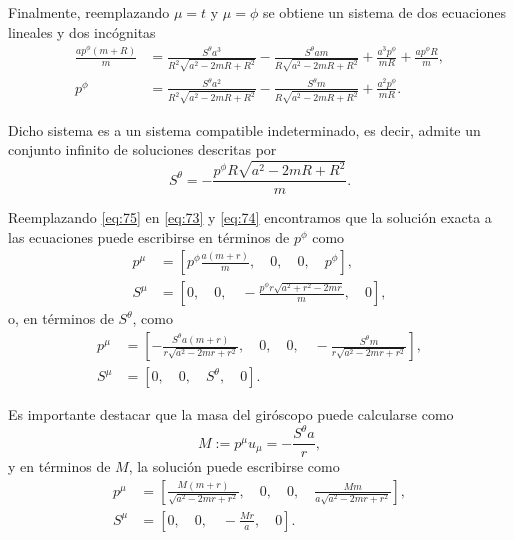 Finalmente, reemplazando $\mu=t$ y $\mu=\phi$ se obtiene un sistema de dos ecuaciones lineales y dos incógnitas
\begin{align}
\frac{a p^{\phi}(m+R)}{m} &= \frac{S^{\theta} a^{3}}{R^{2} \sqrt{a^{2} - 2 m R + R^{2}}} - \frac{S^{\theta} a m}{R\sqrt{a^{2} - 2 m R + R^{2}}} + \frac{a^{3} p^{\phi}}{m R} + \frac{a p^{\phi} R}{m},\\
p^{\phi} &= \frac{S^{\theta} a^{2}}{R^{2}\sqrt{a^{2} - 2 m R + R^{2}}} - \frac{S^{\theta} m}{R\sqrt{a^{2} - 2 m R + R^{2}}} + \frac{a^{2} p^{\phi}}{m R}.
\end{align}

Dicho sistema es a un sistema compatible indeterminado, es decir, admite un conjunto infinito de soluciones descritas por
\begin{equation}
\label{eq:75}
S^{\theta} = - \frac{p^{\phi}R \sqrt{a^2 - 2mR +R^2}}{m}.
\end{equation}

Reemplazando \eqref{eq:75} en \eqref{eq:73} y \eqref{eq:74} encontramos que la solución exacta a las ecuaciones puede escribirse en términos de $p^{\phi}$ como
\begin{align}
p^{\mu} &= \left[ p^{\phi} \frac{a(m+r)}{m},\quad 0,\quad 0,\quad p^{\phi} \right],\\
S^{\mu} &= \left[0,\quad 0,\quad -\frac{p^{\phi} r\sqrt{a^2+r^2-2mr}}{m},\quad 0\right],
\end{align}
o, en términos de $S^{\theta}$, como
\begin{align}
\label{eq:76}
p^{\mu} &= \left [ - \frac{S^{\theta} a \left(m + r\right)}{r \sqrt{a^{2} - 2 m r + r^{2}} }, \quad 0, \quad 0, \quad - \frac{S^{\theta} m}{r\sqrt{a^{2} - 2 m r + r^{2}}}\right ],\\
\label{eq:77}
S^{\mu} &= \left [ 0, \quad 0, \quad S^{\theta}, \quad 0\right ].
\end{align}

Es importante destacar que la masa del giróscopo puede calcularse como
\begin{equation}
\label{eq:78}
M := p^{\mu} u_{\mu} = -\frac{S^{\theta}a}{r},
\end{equation}
y en términos de $M$, la solución puede escribirse como
\begin{align}
\label{eq:86}
p^{\mu} &= \left [ \frac{M \left(m + r\right)}{\sqrt{a^{2} - 2 m r + r^{2}}}, \quad 0, \quad 0, \quad \frac{M m}{a \sqrt{a^{2} - 2 m r + r^{2}}}\right ],\\
\label{eq:87}
S^{\mu} &= \left [ 0, \quad 0, \quad - \frac{Mr}{a}, \quad 0\right ].
\end{align}

